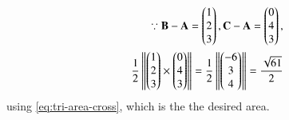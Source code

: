 \begin{align}
\because \mathbf{B}-\mathbf{A} = \begin{pmatrix}1\\2\\3\end{pmatrix}, 
\mathbf{C}-\mathbf{A} = \begin{pmatrix}0\\4\\3\end{pmatrix},
\\
	\frac{1}{2} \left\lVert\begin{pmatrix}1\\2\\3\end{pmatrix} \times \begin{pmatrix}0\\4\\3\end{pmatrix}\right\rVert 
	= 	\frac{1}{2}\left\lVert\begin{pmatrix}-6\\3\\4\end{pmatrix}\right\rVert
= \frac{\sqrt{61}}{2}
\end{align}
			using \eqref{eq:tri-area-cross},
which is the the desired area.






